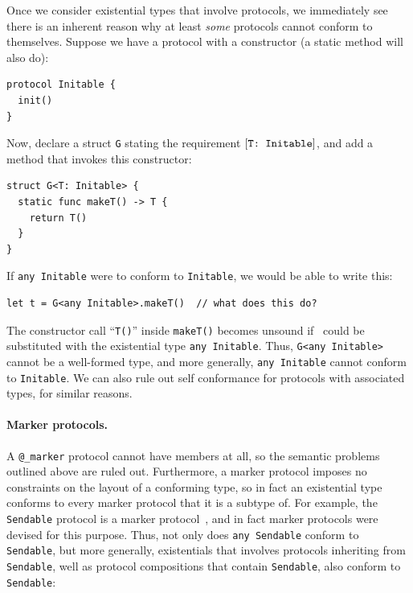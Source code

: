\documentclass[../generics]{subfiles}
\begin{document}
Once we consider existential types that involve protocols, we immediately see there is an inherent reason why at least \emph{some} protocols cannot conform to themselves. Suppose we have a protocol with a constructor (a static method will also do):
\begin{Verbatim}
protocol Initable {
  init()
}
\end{Verbatim}
Now, declare a struct \texttt{G} stating the requirement $[\texttt{T:~Initable}]$, and add a method that invokes this constructor:
\begin{Verbatim}
struct G<T: Initable> {
  static func makeT() -> T {
    return T()
  }
}
\end{Verbatim}
If \texttt{any Initable} were to conform to \texttt{Initable}, we would be able to write this:
\begin{Verbatim}
let t = G<any Initable>.makeT()  // what does this do?
\end{Verbatim}
The constructor call ``\texttt{T()}'' inside \texttt{makeT()} becomes unsound if \tT\ could be substituted with the existential type \texttt{any Initable}. Thus, \texttt{G<any~Initable>} cannot be a well-formed type, and more generally, \texttt{any~Initable} cannot conform to \texttt{Initable}. We can also rule out self conformance for protocols with associated types, for similar reasons.

\paragraph{Marker protocols.} A \verb|@_marker| protocol cannot have members at all, so the semantic problems outlined above are ruled out. Furthermore, a marker protocol imposes no constraints on the layout of a conforming type, so in fact an existential type conforms to every marker protocol that it is a subtype of. For example, the \texttt{Sendable} protocol is a marker protocol~\cite{se0302}, and in fact marker protocols were devised for this purpose. Thus, not only does \texttt{any Sendable} conform to \texttt{Sendable}, but more generally, existentials that involves protocols inheriting from \texttt{Sendable},  well as protocol compositions that contain \texttt{Sendable}, also conform to \texttt{Sendable}:
\end{document}

